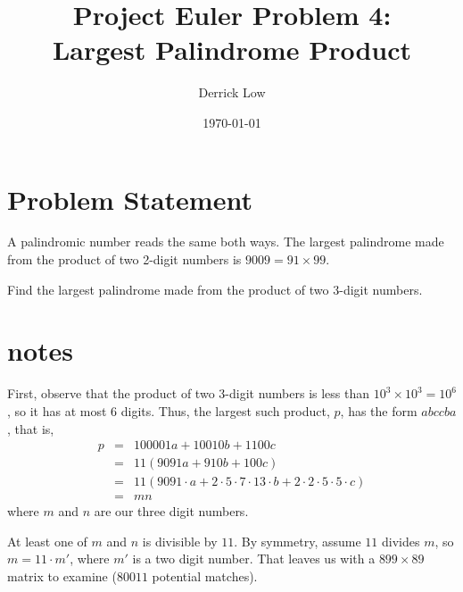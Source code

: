 \documentclass[11pt]{article}
\begin{document}
\title{Project Euler Problem 4: \\Largest Palindrome Product}
\author{Derrick Low}
\date{\today}
\maketitle

\section{Problem Statement}
A palindromic number reads the same both ways. The largest palindrome made from the product of two 2-digit numbers is $9009 = 91 \times 99$.

Find the largest palindrome made from the product of two 3-digit numbers.

\section{notes}
First, observe that the product of two 3-digit numbers is less than $10^3 \times 10^3 = 10^6$, so it has at most 6 digits. Thus, the largest such product, $p$, has the form $abccba$, that is, 
\begin{eqnarray*}
p 
&=& 100001a + 10010b + 1100c \\
&=& 11(9091a + 910b + 100c) \\
&=& 11(9091 \cdot a + 2\cdot 5 \cdot 7 \cdot 13 \cdot b + 2 \cdot 2 \cdot 5 \cdot 5 \cdot c) \\
&=& mn
\end{eqnarray*}
where $m$ and $n$ are our three digit numbers.

At least one of $m$ and $n$ is divisible by $11$. By symmetry, assume $11$ divides $m$, so $m = 11 \cdot m'$, where $m'$ is a two digit number. That leaves us with a $899 \times 89$ matrix to examine ($80011$ potential matches).
\end{document}
